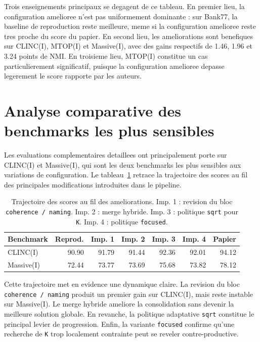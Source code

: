 Trois enseignements principaux se degagent de ce tableau. En premier lieu, la
configuration amelioree n'est pas uniformement dominante : sur Bank77, la
baseline de reproduction reste meilleure, meme si la configuration amelioree
reste tres proche du score du papier. En second lieu, les ameliorations sont
benefiques sur CLINC(I), MTOP(I) et Massive(I), avec des gains respectifs de
1.46, 1.96 et 3.24 points de NMI. En troisieme lieu, MTOP(I) constitue un cas
particulierement significatif, puisque la configuration amelioree depasse
legerement le score rapporte par les auteurs.

\section{Analyse comparative des benchmarks les plus sensibles}

Les evaluations complementaires detaillees ont principalement porte sur
CLINC(I) et Massive(I), qui sont les deux benchmarks les plus sensibles aux
variations de configuration. Le tableau~\ref{tab:improvement-path} retrace la
trajectoire des scores au fil des principales modifications introduites dans le
pipeline.

\begin{table}[h]
  \centering
  \small
  \begin{tabular}{lrrrrrr}
    \toprule
    Benchmark & Reprod. & Imp. 1 & Imp. 2 & Imp. 3 & Imp. 4 & Papier \\
    \midrule
    CLINC(I) & 90.90 & 91.79 & 91.44 & 92.36 & 92.01 & 94.12 \\
    Massive(I) & 72.44 & 73.77 & 73.69 & 75.68 & 73.82 & 78.12 \\
    \bottomrule
  \end{tabular}
  \caption{Trajectoire des scores au fil des ameliorations. Imp. 1 : revision du bloc \texttt{coherence / naming}. Imp. 2 : merge hybride. Imp. 3 : politique \texttt{sqrt} pour \texttt{K}. Imp. 4 : politique \texttt{focused}.}
  \label{tab:improvement-path}
\end{table}

Cette trajectoire met en evidence une dynamique claire. La revision du bloc
\texttt{coherence / naming} produit un premier gain sur CLINC(I), mais reste
instable sur Massive(I). Le merge hybride ameliore la consolidation sans
devenir la meilleure solution globale. En revanche, la politique adaptative
\texttt{sqrt} constitue le principal levier de progression. Enfin, la variante
\texttt{focused} confirme qu'une recherche de \texttt{K} trop localement
contrainte peut se reveler contre-productive.

